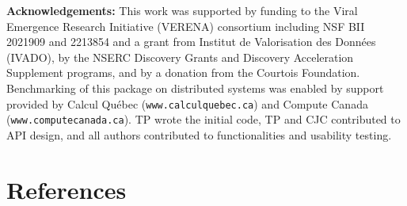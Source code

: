 \documentclass[11pt]{article}
\begin{document}
\textbf{Acknowledgements:} This work was supported by funding to the
Viral Emergence Research Initiative (VERENA) consortium including NSF
BII 2021909 and 2213854 and a grant from Institut de Valorisation des
Données (IVADO), by the NSERC Discovery Grants and Discovery
Acceleration Supplement programs, and by a donation from the Courtois
Foundation. Benchmarking of this package on distributed systems was
enabled by support provided by Calcul Québec
(\texttt{www.calculquebec.ca}) and Compute Canada
(\texttt{www.computecanada.ca}). TP wrote the initial code, TP and CJC
contributed to API design, and all authors contributed to
functionalities and usability testing.

\hypertarget{references}{%
\section*{References}\label{references}}
\end{document}
